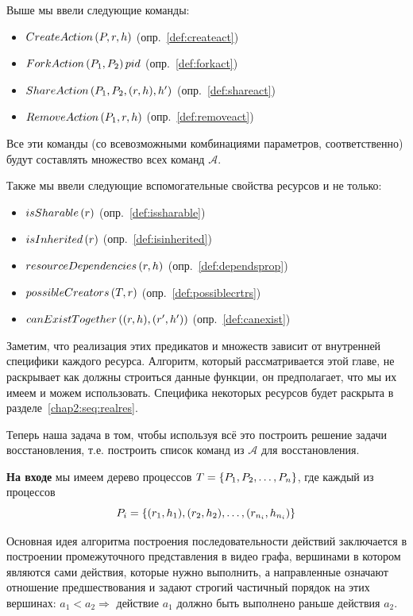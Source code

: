 Выше мы ввели следующие команды:

\begin{itemize}
	\item $CreateAction\left( P, r, h \right)$ (опр.~\ref{def:createact})
	\item $ForkAction\left( P_1, P_2 \right){pid}$ (опр.~\ref{def:forkact})
	\item $ShareAction\left( P_1, P_2, (r, h), h' \right)$ (опр.~\ref{def:shareact})
	\item $RemoveAction\left( P_1, r, h \right)$ (опр.~\ref{def:removeact})
\end{itemize}

Все эти команды (со всевозможными комбинациями параметров, соответственно) будут составлять множество всех команд $\mathcal{A}$.

Также мы ввели следующие вспомогательные свойства ресурсов и не только:

\begin{itemize}
	\item $isSharable\left( r \right)$ (опр.~\ref{def:issharable})
	\item $isInherited\left( r \right)$ (опр.~\ref{def:isinherited})
	\item $resourceDependencies\left( r, h \right)$ (опр.~\ref{def:dependsprop})
	\item $possibleCreators\left( T, r \right)$ (опр.~\ref{def:possiblecrtrs})
	\item $canExistTogether\left( (r, h), (r', h') \right)$ (опр.~\ref{def:canexist})
\end{itemize}

Заметим, что реализация этих предикатов и множеств зависит от внутренней специфики каждого ресурса. Алгоритм, который рассматривается этой главе, не раскрывает как должны строиться данные функции, он предполагает, что мы их имеем и можем использовать. Специфика некоторых ресурсов будет раскрыта в разделе~\ref{chap2:seq:realres}.

Теперь наша задача в том, чтобы используя всё это построить решение задачи восстановления, т.е. построить список команд из $\mathcal{A}$ для восстановления.

\textbf{На входе} мы имеем дерево процессов $T = \left\lbrace P_1, P_2, \ldots, P_n \right\rbrace$, где каждый из процессов 
\begin{equation*}
P_i = \left\lbrace (r_1, h_1), (r_2, h_2), \ldots, (r_{n_i}, h_{n_i}) \right\rbrace
\end{equation*}

Основная идея алгоритма построения последовательности действий заключается в построении промежуточного представления
в видео графа, вершинами в котором являются сами действия, которые нужно выполнить, а направленные означают отношение предшествования и задают строгий частичный порядок на этих вершинах: $a_1 < a_2 \Longrightarrow $ действие $a_1$ должно быть выполнено раньше действия $a_2$.

